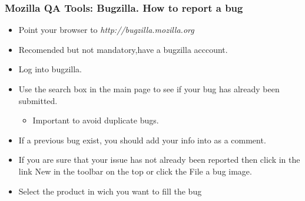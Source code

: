\documentclass{beamer}
\begin{document}
\begin{frame}
 \frametitle{Mozilla QA Tools: Bugzilla. How to report a bug}
 \begin{itemize}
    \item Point your browser to \textit{http://bugzilla.mozilla.org}
    \item Recomended but not mandatory,have a bugzilla acccount.
    \item Log into bugzilla.
    \item Use the search box in the main page to see if your bug has already been submitted.
    \begin{itemize}
       \item Important to avoid duplicate bugs.
    \end{itemize}
    \item If a previous bug exist, you should add your info into as a comment.
    \item If you are sure that your issue has not already been reported then click in the link New in the toolbar on the top or click the File a bug image.
    \item Select the product in wich you want to fill the bug
 \end{itemize}
\end{frame}

\end{document}
